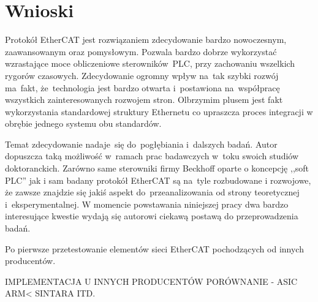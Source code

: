 \section{Wnioski}
Protokół EtherCAT jest rozwiązaniem zdecydowanie bardzo nowoczesnym, zaawansowanym oraz pomysłowym. Pozwala bardzo dobrze wykorzystać wzrastające moce obliczeniowe sterowników~PLC, przy zachowaniu wszelkich rygorów czasowych.
Zdecydowanie ogromny wpływ na~tak szybki rozwój ma~fakt, że~technologia jest bardzo otwarta i~postawiona na~współpracę wszystkich zainteresowanych rozwojem stron. Olbrzymim plusem jest fakt wykorzystania standardowej struktury Ethernetu co upraszcza proces integracji w obrębie jednego systemu obu standardów.

Temat zdecydowanie nadaje~się do~pogłębiania i~dalszych badań. Autor dopuszcza taką możliwość w~ramach prac badawczych w~toku swoich studiów doktoranckich. Zarówno same sterowniki firmy Beckhoff oparte o koncepcję ,,soft PLC'' jak i sam badany protokół EtherCAT są na~tyle rozbudowane i rozwojowe, że zawsze znajdzie się jakiś aspekt do~przeanalizowania od strony teoretycznej i~eksperymentalnej. W momencie powstawania niniejszej pracy dwa bardzo interesujące kwestie wydają się autorowi ciekawą postawą do przeprowadzenia badań.

Po pierwsze przetestowanie elementów sieci EtherCAT pochodzących od innych producentów.

IMPLEMENTACJA U INNYCH PRODUCENTÓW PORÓWNANIE - ASIC ARM< SINTARA ITD.


